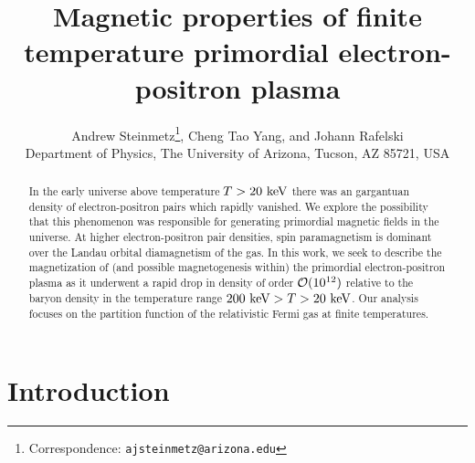 \documentclass[a4paper]{article}
\title{\boldmath Magnetic properties of finite temperature primordial electron-positron plasma}
\author{Andrew Steinmetz\orc{\orcC}\thanks{Correspondence: \texttt{ajsteinmetz@arizona.edu}}, Cheng Tao Yang\orc{\orcB}, and Johann Rafelski\orc{\orcA}\\ Department of Physics, The University of Arizona, Tucson, AZ 85721, USA}
\begin{document}
\maketitle

\begin{abstract}
    In the early universe above temperature $T>20\text{ keV}$ there was an gargantuan density of electron-positron pairs which rapidly vanished. We explore the possibility that this phenomenon was responsible for generating primordial magnetic fields in the universe. At higher electron-positron pair densities, spin paramagnetism is dominant over the Landau orbital diamagnetism of the gas. In this work, we seek to describe the magnetization of (and possible magnetogenesis within) the primordial electron-positron plasma as it underwent a rapid drop in density of order ${\cal O}(10^{12})$ relative to the baryon density in the temperature range $200\text{ keV}>T>20\text{ keV}$. Our analysis focuses on the partition function of the relativistic Fermi gas at finite temperatures.
\end{abstract}


\section{Introduction}\label{sec:Introduction}
\end{document}
